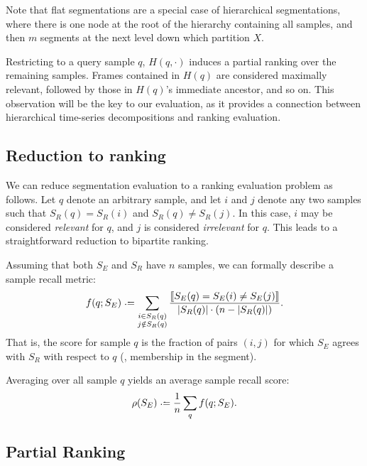\documentclass{article}
\begin{document}
Note that flat segmentations are a special case of hierarchical segmentations, where there is one node at the root of the hierarchy
containing all samples, and then $m$ segments at the next level down which partition $X$.

Restricting to a query sample $q$, $H(q, \cdot)$ induces a partial ranking over the
remaining samples.  Frames contained in $H(q)$ are considered maximally relevant,
followed by those in $H(q)$'s immediate ancestor, and so on.
This observation will be the key to our evaluation, as it provides a connection
between hierarchical time-series decompositions and ranking evaluation.


\subsection{Reduction to ranking}


We can reduce segmentation evaluation to a ranking evaluation problem as follows.
Let $q$ denote an arbitrary sample, and let $i$ and $j$ denote any two samples such that $S_R(q) = S_R(i)$ and $S_R(q) \neq S_R(j)$.
In this case, $i$ may be considered \emph{relevant} for $q$, and $j$ is considered \emph{irrelevant} for $q$.
This leads to a straightforward reduction to bipartite ranking.

Assuming that both $S_E$ and $S_R$ have $n$ samples, we can formally describe a sample 
recall metric:
\begin{equation}
f(q ; S_E) \defeq 
\sum_{\substack{i \in S_R(q)\\ j \notin S_R(q)}}
\frac{\ind{S_E(q) = S_E(i) \neq S_E(j) }}{|S_R(q)|\cdot (n -
|S_R(q)|)}.\label{flatrecall}
\end{equation}
That is, the score for sample $q$ is the fraction of pairs $(i, j)$ for which $S_E$
agrees with $S_R$ with respect to $q$ (\ie, membership in the segment).

Averaging over all sample $q$ yields an average sample recall score:
\begin{equation}
\rho(S_E) \defeq \frac{1}{n} \sum_q f(q ; S_E).\label{avgrecall}
\end{equation}
\nocite{levy2008structural}


\subsection{Partial Ranking}
\end{document}
